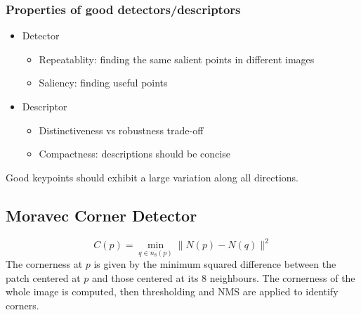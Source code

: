 \documentclass{article}
\begin{document}
\subsubsection{Properties of good detectors/descriptors}

\begin{itemize}
  \item Detector \begin{itemize}
      \item Repeatablity: finding the same salient points in different images 
      \item Saliency: finding useful points 
    \end{itemize}
  \item Descriptor \begin{itemize}
      \item Distinctiveness vs robustness trade-off
      \item Compactness: descriptions should be concise
    \end{itemize}
\end{itemize}
Good keypoints should exhibit a large variation along all directions. 
\subsection{Moravec Corner Detector}
\[
  C(p) = \min_{q\in n_8(p)} \|N(p)-N(q)\|^2 
\]
The cornerness at $p$ is given by the minimum squared difference between the patch centered at $p$ and those centered at its 8 neighbours. The cornerness of the whole image is computed, then thresholding and NMS are applied to identify corners.
\end{document}
